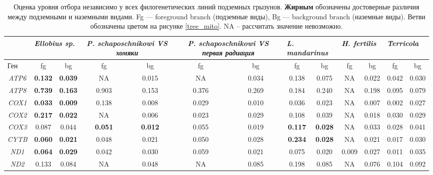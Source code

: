 \begin{landscape}
	
	\begin{table}[]
		\caption{Оценка уровня отбора независимо у всех филогенетических линий подземных грызунов. \textbf{Жирным} обозначены достоверные различия между подземными и наземными видами. Fg --- foreground branch (подземные виды), Bg --- background branch (наземные виды). Ветви обозначены цветом на рисунке \ref{tree_mito}. NA -- рассчитать значение невозможно. }\label{MT_branch} \vspace{5mm}
		\large
		
		\begin{tabular}{|c|c|c|c|c|c|c|c|c|c|c|c|c|}
			\hline
			\multicolumn{1}{|l|}{}    & \multicolumn{2}{l|}{\textit{Ellobius sp.}} & \multicolumn{2}{p{5cm}|}{\textit{P. schaposchnikowi VS хомяки}} & \multicolumn{2}{p{5cm}|}{\textit{P. schaposchnikowi VS первая радиация}} & \multicolumn{2}{l|}{\textit{L. mandarinus}} & \multicolumn{2}{l|}{\textit{H. fertilis}} & \multicolumn{2}{l|}{\textit{Terricola}} \\ \hline
			\multicolumn{1}{|l|}{Ген} & fg & bg & fg & bg & fg & bg & fg & bg & fg & bg & fg & bg \\ \hline
			{\textit{ATP6}} & \textbf{0.132} & \textbf{0.039} & NA & 0.015 & NA & 0.034 & 0.138 & 0.075 & NA & 0.022 & 0.042 & 0.030 \\ \hline
			\textit{ATP8} & \textbf{0.739} & \textbf{0.163} & 0.903 & 0.153 & 0.376 & 0.269 & 0.184 & 0.240 & NA & 0.198 & 0.095& 0.079 \\ \hline
			\textit{COX1} & \textbf{0.033} & \textbf{0.009} & 0.138 & 0.008 & 0.029 & 0.010 & 0.036 & 0.023 & NA & 0.007 & 0.002& 0.027 \\ \hline
			\textit{COX2} & \textbf{0.217} & \textbf{0.022} & NA & 0.006 & 0.023 & 0.029 & 0.108 & 0.039 & NA & 0.018 & 0.030& 0.029 \\ \hline
			\textit{COX3} & 0.087 & 0.044 & \textbf{0.051} & \textbf{0.012} & 0.055 & 0.019 & \textbf{0.117} & \textbf{0.028} & NA & 0.033 & 0.028& 0.041 \\ \hline
			\textit{CYTB} & \textbf{0.060} & \textbf{0.021} & 0.048 & 0.021 & 0.050 & 0.028 & \textbf{0.234} & \textbf{0.028} & NA & 0.021 & 0.017& 0.030 \\ \hline
			\textit{ND1} & \textbf{0.064} & \textbf{0.029} & 0.042 & 0.030 & 0.059 & 0.021 & 0.075 & 0.020 & 0.009 & 0.027 & 0.011& 0.035 \\ \hline
			{\textit{ND2}} & 0.133 & 0.084 & NA & 0.048 & NA & 0.085 & 0.198 & 0.085 & NA & 0.076 & 0.104& 0.092 \\ \hline

\end{tabular}
\end{table}
\end{landscape}
